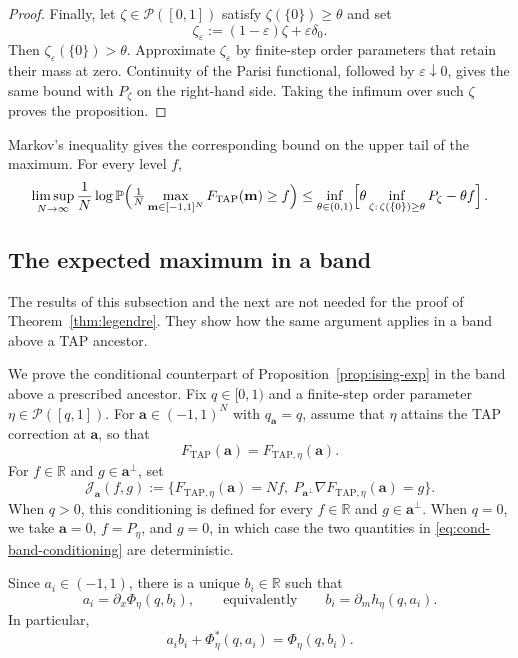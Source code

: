 \documentclass[a4paper,10pt,reqno]{amsart}
\numberwithin{equation}{section}
\newcommand{\dR}{\mathbb{R}}%
\newcommand{\dP}{\mathbb{P}}%
\newcommand{\mc}{\mathcal}
\newcommand{\TAP}{\mathrm{TAP}}
\newcommand{\bfm}{\mathbf{m}}
\newcommand{\bfa}{\mathbf{a}}
\begin{document}
\begin{proof}
		Finally, let $\zeta\in\mc P([0,1])$ satisfy
		$\zeta(\{0\})\ge\theta$ and set
		\[
		\zeta_\varepsilon
		:=
		(1-\varepsilon)\zeta+\varepsilon\delta_0.
		\]
		Then $\zeta_\varepsilon(\{0\})>\theta$. Approximate
		$\zeta_\varepsilon$ by finite-step order parameters that retain
		their mass at zero. Continuity of the Parisi functional, followed
		by $\varepsilon\downarrow0$, gives the same bound with $P_\zeta$
		on the right-hand side. Taking the infimum over such $\zeta$ proves
		the proposition.
	\end{proof}
	
	Markov's inequality gives the corresponding bound on the upper tail of the maximum. For every level
	$f$,
	\[
	\limsup_{N\to\infty}\frac1N\log\dP\Bigl(\tfrac1N\max_{\bfm\in[-1,1]^N}F_{\TAP}(\bfm)\ge f\Bigr)
	\le\inf_{\theta\in(0,1)}\Bigl[\theta\inf_{\zeta:\,\zeta(\{0\})\ge\theta}P_\zeta-\theta f\Bigr]\,.
	\]
	
	\subsection{The expected maximum in a band}
	
	The results of this subsection and the next are not needed for the proof of
	Theorem~\ref{thm:legendre}. They show how the same argument applies in a
	band above a TAP ancestor.
	
	We prove the conditional counterpart of
	Proposition~\ref{prop:ising-exp} in the band above a prescribed
	ancestor. Fix $q\in[0,1)$ and a finite-step order parameter
	$\eta\in\mc P([q,1])$. For $\bfa\in(-1,1)^N$ with $q_\bfa=q$,
	assume that $\eta$ attains the TAP correction at $\bfa$, so that
	\[
	F_{\TAP}(\bfa)=F_{\TAP,\eta}(\bfa).
	\]
	For $f\in\dR$ and $g\in\bfa^\perp$, set
	\begin{equation}\label{eq:cond-band-conditioning}
		\mc J_\bfa(f,g)
		:=
		\bigl\{
		F_{\TAP,\eta}(\bfa)=Nf,
		\ P_{\bfa^\perp}\nabla F_{\TAP,\eta}(\bfa)=g
		\bigr\}.
	\end{equation}
	When $q>0$, this conditioning is defined for every $f\in\dR$ and
	$g\in\bfa^\perp$. When $q=0$, we take $\bfa=0$, $f=P_\eta$, and
	$g=0$, in which case the two quantities in
	\eqref{eq:cond-band-conditioning} are deterministic.
	
	Since $a_i\in(-1,1)$, there is a unique $b_i\in\dR$ such that
	\[
	a_i=\partial_x\Phi_\eta(q,b_i),
	\qquad\text{equivalently}\qquad
	b_i=\partial_m h_\eta(q,a_i).
	\]
	In particular,
	\[
	a_i b_i+\Phi_\eta^*(q,a_i)=\Phi_\eta(q,b_i).
	\]
	
\end{document}
